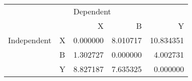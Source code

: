 \begin{tabular}{llrrr}
\toprule
            &   & \multicolumn{3}{l}{Dependent} \\
            &   &         X &         B &          Y \\
\midrule
Independent & X &  0.000000 &  8.010717 &  10.834351 \\
            & B &  1.302727 &  0.000000 &   4.002731 \\
            & Y &  8.827187 &  7.635325 &   0.000000 \\
\bottomrule
\end{tabular}
